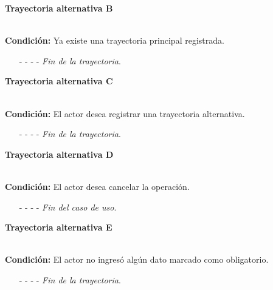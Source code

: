 \hypertarget{CU12-1-1-1:TAB}{\textbf{Trayectoria alternativa B}}\\
\noindent \textbf{Condición:} Ya existe una trayectoria principal registrada.
\begin{enumerate}
	\UCpaso[\UCsist] Selecciona automáticamente la opción ''Alternativa'' del campo ''Tipo''.
	\UCpaso[\UCsist] Inhabilita el campo ''tipo''.
	\UCpaso[\UCsist] Muestra el campo de condición.
	\UCpaso Continúa con el paso \ref{CU12.1.1.1-TB3} de la trayectoria alternativa C.
	\item[- -] - - {\em {Fin de la trayectoria}}.%
\end{enumerate}
\hypertarget{CU12-1-1-1:TAC}{\textbf{Trayectoria alternativa C}}\\
\noindent \textbf{Condición:} El actor desea registrar una trayectoria alternativa.
\begin{enumerate}
	\UCpaso[\UCactor] Selecciona la opción ''Alternativa'' del campo ''Tipo''.
	\UCpaso[\UCsist] Muestra el campo de condición.
	\UCpaso[\UCactor] Ingresa la condición de la trayectoria. \label{CU12.1.1.1-TB3}
	\UCpaso[\UCactor] Selecciona si en la trayectoria se termina el caso de uso.
	\UCpaso Continúa con el paso \ref{CU12.1.1.1-P18} de la trayectoria principal.
	\item[- -] - - {\em {Fin de la trayectoria}}.%
\end{enumerate}
\hypertarget{CU12-1-1-1:TAD}{\textbf{Trayectoria alternativa D}}\\
\noindent \textbf{Condición:} El actor desea cancelar la operación.
\begin{enumerate}
	\UCpaso[\UCactor] Solicita cancelar la operación oprimiendo el botón  de la pantalla .
	\UCpaso[\UCsist] Muestra la pantalla .
	\item[- -] - - {\em {Fin del caso de uso}}.%
\end{enumerate}
\hypertarget{CU12-1-1-1:TAE}{\textbf{Trayectoria alternativa E}}\\
\noindent \textbf{Condición:} El actor no ingresó algún dato marcado como obligatorio.
\begin{enumerate}
	\UCpaso[\UCsist] Muestra el mensaje  señalando el campo que presenta el error en la pantalla .
	\UCpaso Regresa al paso \ref{CU12.1.1.1-P16} de la trayectoria principal.
	\item[- -] - - {\em {Fin de la trayectoria}}.%
\end{enumerate}
